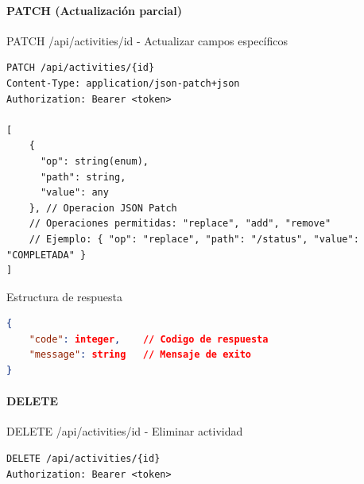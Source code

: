 \documentclass[11pt,a4paper]{article}
\begin{document}
\paragraph{PATCH (Actualización parcial)}
\begin{center}
	\begin{minipage}{\textwidth}
		\begin{codebox}{PATCH /api/activities/{id} - Actualizar campos específicos}
			\begin{lstlisting}[language=HTTP]
PATCH /api/activities/{id}
Content-Type: application/json-patch+json
Authorization: Bearer <token>

[
    { 
      "op": string(enum), 
      "path": string, 
      "value": any 
    }, // Operacion JSON Patch
    // Operaciones permitidas: "replace", "add", "remove"
    // Ejemplo: { "op": "replace", "path": "/status", "value": "COMPLETADA" }
]
\end{lstlisting}
		\end{codebox}
	\end{minipage}
\end{center}

\begin{center}
	\begin{minipage}{\textwidth}
		\begin{codebox}{Estructura de respuesta}
			\begin{lstlisting}[language=json]
{
    "code": integer,    // Codigo de respuesta
    "message": string   // Mensaje de exito
}
\end{lstlisting}
		\end{codebox}
	\end{minipage}
\end{center}

\paragraph{DELETE}
\begin{center}
	\begin{minipage}{\textwidth}
		\begin{codebox}{DELETE /api/activities/{id} - Eliminar actividad}
			\begin{lstlisting}[language=HTTP]
DELETE /api/activities/{id}
Authorization: Bearer <token>
\end{lstlisting}
		\end{codebox}
	\end{minipage}
\end{center}
\end{document}
